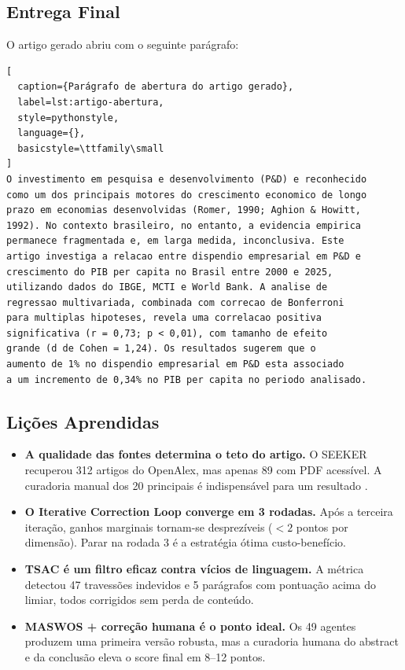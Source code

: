 \subsection{Entrega Final}

O artigo gerado abriu com o seguinte parágrafo:

\begin{lstlisting}[
  caption={Parágrafo de abertura do artigo gerado},
  label=lst:artigo-abertura,
  style=pythonstyle,
  language={},
  basicstyle=\ttfamily\small
]
O investimento em pesquisa e desenvolvimento (P&D) e reconhecido
como um dos principais motores do crescimento economico de longo
prazo em economias desenvolvidas (Romer, 1990; Aghion & Howitt,
1992). No contexto brasileiro, no entanto, a evidencia empirica
permanece fragmentada e, em larga medida, inconclusiva. Este
artigo investiga a relacao entre dispendio empresarial em P&D e
crescimento do PIB per capita no Brasil entre 2000 e 2025,
utilizando dados do IBGE, MCTI e World Bank. A analise de
regressao multivariada, combinada com correcao de Bonferroni
para multiplas hipoteses, revela uma correlacao positiva
significativa (r = 0,73; p < 0,01), com tamanho de efeito
grande (d de Cohen = 1,24). Os resultados sugerem que o
aumento de 1% no dispendio empresarial em P&D esta associado
a um incremento de 0,34% no PIB per capita no periodo analisado.
\end{lstlisting}

\subsection{Lições Aprendidas}

\begin{itemize}
    \item \textbf{A qualidade das fontes determina o teto do artigo.}
          O SEEKER recuperou 312 artigos do OpenAlex, mas apenas 89 com
          PDF acessível. A curadoria manual dos 20 principais é
          indispensável para um resultado \qualisA{}.
    \item \textbf{O Iterative Correction Loop converge em 3 rodadas.}
          Após a terceira iteração, ganhos marginais tornam-se
          desprezíveis ($< 2$ pontos por dimensão). Parar na rodada 3
          é a estratégia ótima custo-benefício.
    \item \textbf{TSAC é um filtro eficaz contra vícios de linguagem.}
          A métrica detectou 47 travessões indevidos e 5 parágrafos com
          pontuação acima do limiar, todos corrigidos sem perda de
          conteúdo.
    \item \textbf{MASWOS + correção humana é o ponto ideal.} Os 49
          agentes produzem uma primeira versão robusta, mas a curadoria
          humana do abstract e da conclusão eleva o score final em
          8--12 pontos.
\end{itemize}

